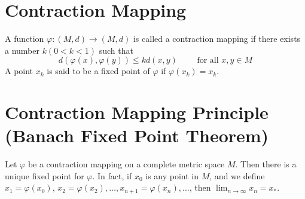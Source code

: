 \documentclass[../main-sheet.tex]{subfiles}
\begin{document}
\section{Contraction Mapping}
A function $ \varphi:(M,d)\to (M,d) $ is called a contraction mapping if there exists a number $ k(0<k<1) $ such that
\[
    d(\varphi(x),\varphi(y))\leq k d(x,y)\qquad \text{ for all }x,y\in M
    \]
A point $ x_k $ is said to be a fixed point of $ \varphi $ if $ \varphi(x_k)=x_k $.
\section{Contraction Mapping Principle (Banach Fixed Point Theorem)}
Let $ \varphi $ be a contraction mapping on a complete metric space $ M $. Then there is a unique fixed point for $ \varphi $. In fact, if $ x_0 $ is any point in $ M $, and we define $ x_1=\varphi(x_0) $, $ x_2=\varphi(x_2),\dots, x_{n+1}=\varphi(x_n),\dots $, then $ \lim_{n\to \infty} x_n=x_{*} $.
\end{document}

